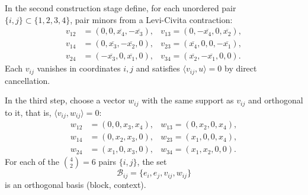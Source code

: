 \documentclass[%
  reprint,
  superscriptaddress,
  showpacs,
  showkeys,
  amsmath,amssymb,
  pra,
  longbibliography,
  floatfix,
  x11names
]{revtex4-2}
\newcommand{\rev}[1]{{\color{revisionblue}#1}}
\begin{document}
In the second construction stage define, for each unordered pair $\{i,j\}\subset\{1,2,3,4\}$, pair minors from a Levi-Civita contraction:
\begin{align*}
v_{12} &= (0,0,\overline{x_4},-\overline{x_3}), &
v_{13}  = (0,-\overline{x_4},0,\overline{x_2}), \\
v_{14} &= (0,\overline{x_3},-\overline{x_2},0), &
v_{23}  = (\overline{x_4},0,0,-\overline{x_1}), \\
v_{24} &= (-\overline{x_3},0,\overline{x_1},0), &
v_{34}  = (\overline{x_2},-\overline{x_1},0,0).
\end{align*}
Each $v_{ij}$ vanishes in coordinates $i,j$ and satisfies $\langle v_{ij},u\rangle=0$ by direct cancellation.

In the third step, choose a vector $w_{ij}$ with the same support as $v_{ij}$ and orthogonal to it, that is, $\langle v_{ij},w_{ij}\rangle=0$:
\begin{align*}
w_{12}&=(0,0,x_3,x_4), &
w_{13} =(0,x_2,0,x_4), \\
w_{14}&=(0,x_2,x_3,0), &
w_{23} =(x_1,0,0,x_4), \\
w_{24}&=(x_1,0,x_3,0), &
w_{34} =(x_1,x_2,0,0).
\end{align*}
\rev{For each of the $\binom{4}{2}=6$ pairs $\{i,j\}$, the set}
\[
\mathcal{B}_{ij}=\{e_i, e_j, v_{ij}, w_{ij}\}
\]
is an orthogonal basis (block, context).
\end{document}
